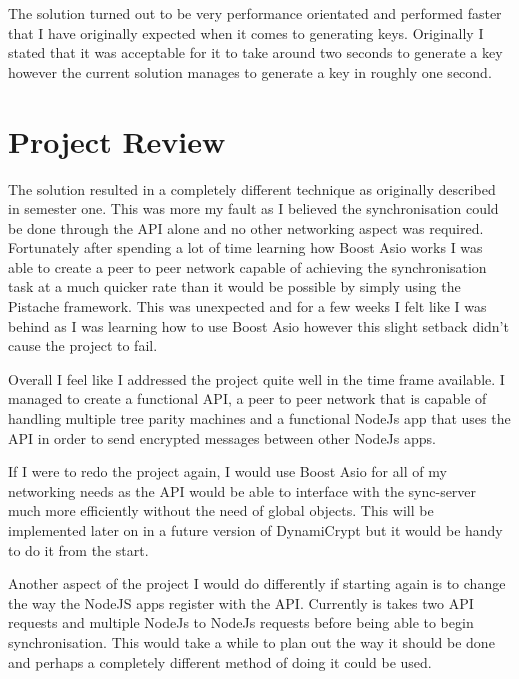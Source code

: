 The solution turned out to be very performance orientated and performed faster that I have originally expected when it comes to generating keys. Originally I stated that it was acceptable for it to take around two seconds to generate a key however the current solution manages to generate a key in roughly one second.


\section{Project Review}
The solution resulted in a completely different technique as originally described in semester one. This was more my fault as I believed the synchronisation could be done through the API alone and no other networking aspect was required. Fortunately after spending a lot of time learning how Boost Asio works I was able to create a peer to peer network capable of achieving the synchronisation task at a much quicker rate than it would be possible by simply using the Pistache framework. This was unexpected and for a few weeks I felt like I was behind as I was learning how to use Boost Asio however this slight setback didn't cause the project to fail. 

Overall I feel like I addressed the project quite well in the time frame available. I managed to create a functional API, a peer to peer network that is capable of handling multiple tree parity machines and a functional NodeJs app that uses the API in order to send encrypted messages between other NodeJs apps.

If I were to redo the project again, I would use Boost Asio for all of my networking needs as the API would be able to interface with the sync-server much more efficiently without the need of global objects. This will be implemented later on in a future version of DynamiCrypt but it would be handy to do it from the start.

Another aspect of the project I would do differently if starting again is to change the way the NodeJS apps register with the API. Currently is takes two API requests and multiple NodeJs to NodeJs requests before being able to begin synchronisation. This would take a while to plan out the way it should be done and perhaps a completely different method of doing it could be used.





